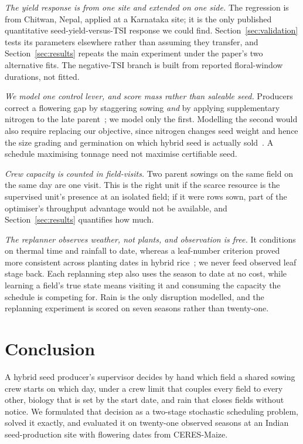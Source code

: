 \documentclass[10pt,twocolumn]{article}
\begin{document}
\emph{The yield response is from one site and extended on one side.} The
regression is from Chitwan, Nepal, applied at a Karnataka site; it is the
only published quantitative seed-yield-versus-TSI response we could find.
Section~\ref{sec:validation} tests its parameters elsewhere rather than
assuming they transfer, and Section~\ref{sec:results} repeats the main
experiment under the paper's two alternative fits. The negative-TSI branch
is built from reported floral-window durations, not fitted.

\emph{We model one control lever, and score mass rather than saleable seed.}
Producers correct a flowering gap by staggering sowing \emph{and} by applying
supplementary nitrogen to the late parent~\cite{priyanka2017,patil2026,%
asefa2024}; we model only the first. Modelling the second would also require
replacing our objective, since nitrogen changes seed weight and hence the
size grading and germination on which hybrid seed is actually
sold~\cite{marahatta2025}. A schedule maximising tonnage need not maximise
certifiable seed.

\emph{Crew capacity is counted in field-visits.} Two parent sowings on the
same field on the same day are one visit. This is the right unit if the
scarce resource is the supervised unit's presence at an isolated field; if
it were rows sown, part of the optimiser's throughput advantage would not
be available, and Section~\ref{sec:results} quantifies how much.

\emph{The replanner observes weather, not plants, and observation is free.}
It conditions on thermal time and rainfall to date, whereas a leaf-number
criterion proved more consistent across planting dates in hybrid
rice~\cite{varma2018}; we never feed observed leaf stage back. Each
replanning step also uses the season to date at no cost, while learning a
field's true state means visiting it and consuming the capacity the
schedule is competing for. Rain is the only disruption modelled, and the
replanning experiment is scored on seven seasons rather than
twenty-one.

\section{Conclusion}

A hybrid seed producer's supervisor decides by hand which field a
shared sowing crew starts on which day, under a crew limit that couples
every field to every other, biology that is set by the start date, and
rain that closes fields without notice. We formulated that decision as
a two-stage stochastic scheduling problem, solved it exactly, and
evaluated it on twenty-one observed seasons at an Indian
seed-production site with flowering dates from CERES-Maize.
\end{document}
